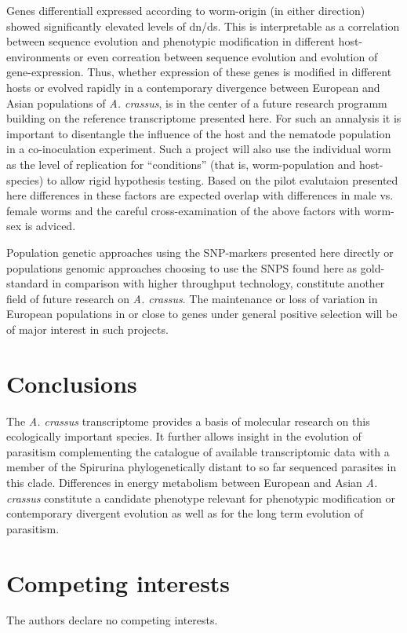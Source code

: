 \documentclass[10pt]{bmc_article}
\newenvironment{bmcformat}{\begin{raggedright}\baselineskip20pt\sloppy\setboolean{publ}{false}}{\end{raggedright}\baselineskip20pt\sloppy}
\begin{document}
\begin{bmcformat}
Genes differentiall expressed according to worm-origin (in either
direction) showed significantly elevated levels of dn/ds. This is
interpretable as a correlation between sequence evolution and
phenotypic modification in different host-environments or even
correation between sequence evolution and evolution of
gene-expression. Thus, whether expression of these genes is modified
in different hosts or evolved rapidly in a contemporary divergence
between European and Asian populations of \textit{A. crassus}, is in
the center of a future research programm building on the reference
transcriptome presented here. For such an annalysis it is important to
disentangle the influence of the host and the nematode population in a
co-inoculation experiment. Such a project will also use the individual
worm as the level of replication for ``conditions'' (that is,
worm-population and host-species) to allow rigid hypothesis
testing. Based on the pilot evalutaion presented here differences in
these factors are expected overlap with differences in male vs. female
worms and the careful cross-examination of the above factors with
worm-sex is adviced.

Population genetic approaches using the SNP-markers presented here
directly or populations genomic approaches choosing to use the SNPS
found here as gold-standard in comparison with higher throughput
technology, constitute another field of future research on
\textit{A. crassus}. The maintenance or loss of variation in European
populations in or close to genes under general positive selection will
be of major interest in such projects.

\section*{Conclusions}

The \textit{A. crassus} transcriptome provides a basis of molecular
research on this ecologically important species. It further allows
insight in the evolution of parasitism complementing the catalogue of
available transcriptomic data with a member of the Spirurina
phylogenetically distant to so far sequenced parasites in this clade.
Differences in energy metabolism between European and Asian
\textit{A. crassus} constitute a candidate phenotype relevant for
phenotypic modification or contemporary divergent evolution as well as
for the long term evolution of parasitism.

\section*{Competing interests}
The authors declare no competing interests.


\end{bmcformat}
\end{document}
